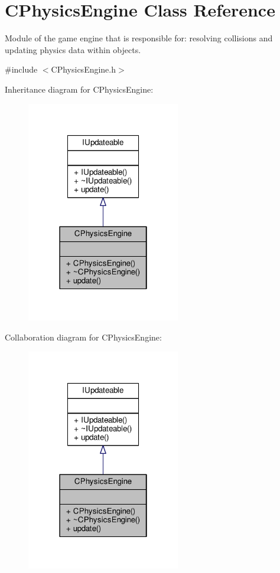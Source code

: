 \hypertarget{classCPhysicsEngine}{\section{C\-Physics\-Engine Class Reference}
\label{classCPhysicsEngine}
}


Module of the game engine that is responsible for\-: resolving collisions and updating physics data within objects.  




{\ttfamily \#include $<$C\-Physics\-Engine.\-h$>$}



Inheritance diagram for C\-Physics\-Engine\-:\nopagebreak
\begin{figure}[H]
\begin{center}
\leavevmode
\includegraphics[width=190pt]{classCPhysicsEngine__inherit__graph}
\end{center}
\end{figure}


Collaboration diagram for C\-Physics\-Engine\-:\nopagebreak
\begin{figure}[H]
\begin{center}
\leavevmode
\includegraphics[width=190pt]{classCPhysicsEngine__coll__graph}
\end{center}
\end{figure}
